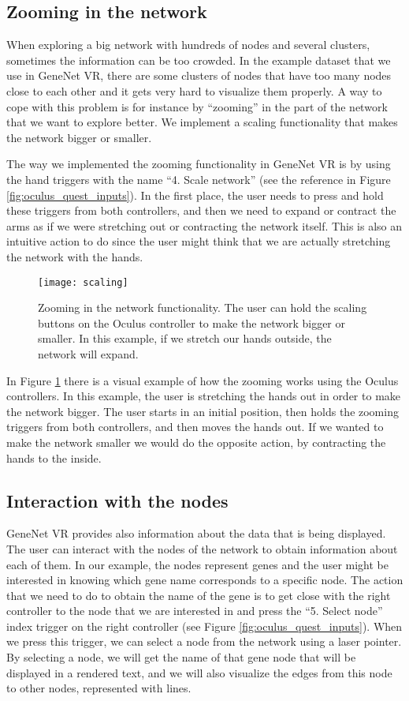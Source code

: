 \subsection{Zooming in the network}
When exploring a big network with hundreds of nodes and several clusters, sometimes the information can be too crowded. In the example dataset that we use in GeneNet VR, there are some clusters of nodes that have too many nodes close to each other and it gets very hard to visualize them properly. A way to cope with this problem is for instance by “zooming” in the part of the network that we want to explore better. We implement a scaling functionality that makes the network bigger or smaller.

The way we implemented the zooming functionality in GeneNet VR is by using the hand triggers with the name “4. Scale network” (see the reference in Figure \ref{fig:oculus_quest_inputs}). In the first place, the user needs to press and hold these triggers from both controllers, and then we need to expand or contract the arms as if we were stretching out or contracting the network itself. This is also an intuitive action to do since the user might think that we are actually stretching the network with the hands.

\begin{figure}[h!]
    \centering%
    \texttt{[image: scaling]}
    \caption{Zooming in the network functionality. The user can hold the scaling buttons on the Oculus controller to make the network bigger or smaller. In this example, if we stretch our hands outside, the network will expand.}
    \label{fig:scaling}
\end{figure}%


In Figure \ref{fig:scaling} there is a visual example of how the zooming works using the Oculus controllers. In this example, the user is stretching the hands out in order to make the network bigger. The user starts in an initial position, then holds the zooming triggers from both controllers, and then moves the hands out. If we wanted to make the network smaller we would do the opposite action, by contracting the hands to the inside.

\subsection{Interaction with the nodes}
GeneNet VR provides also information about the data that is being displayed. The user can interact with the nodes of the network to obtain information about each of them. In our example, the nodes represent genes and the user might be interested in knowing which gene name corresponds to a specific node. The action that we need to do to obtain the name of the gene is to get close with the right controller to the node that we are interested in and press the “5. Select node” index trigger on the right controller (see Figure \ref{fig:oculus_quest_inputs}). When we press this trigger, we can select a node from the network using a laser pointer. By selecting a node, we will get the name of that gene node that will be displayed in a rendered text, and we will also visualize the edges from this node to other nodes, represented with lines.

